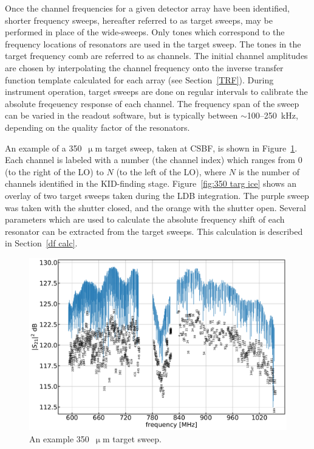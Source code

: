 Once the channel frequencies for a given detector array have been identified, shorter frequency sweeps, hereafter referred to as target sweeps, may be performed in place of the wide-sweeps. Only tones which correspond to the frequency locations of resonators are used in the target sweep. The tones in the target frequency comb are referred to as channels. The initial channel amplitudes are chosen by interpolating the channel frequency onto the inverse transfer function template calculated for each array (see Section~\ref{TRF}). During instrument operation, target sweeps are done on regular intervals to calibrate the absolute freqeuency response of each channel. The frequency span of the sweep can be varied in the readout software, but is typically between $\sim$100--250~kHz, depending on the quality factor of the resonators.

An example of a 350~$\upmu$m target sweep, taken at CSBF, is shown in Figure~\ref{fig:350 targ fts}. Each channel is labeled with a number (the channel index) which ranges from 0 (to the right of the LO) to $N$ (to the left of the LO), where $N$ is the number of channels identified in the KID-finding stage. Figure~\ref{fig:350 targ ice} shows an overlay of two target sweeps taken during the LDB integration. The purple sweep was taken with the shutter closed, and the orange with the shutter open. Several parameters which are used to calculate the absolute frequency shift of each resonator can be extracted from the target sweeps. This calculation is described in Section~\ref{df calc}.

\begin{figure}[!htbp]
\centering
\includegraphics[width=\textwidth]{figures/blast_data/sweeps/350_targ_fts}
\caption[~An example  target sweep.]{An example 350~$\upmu$m target sweep.}
\label{fig:350 targ fts}
\end{figure}

